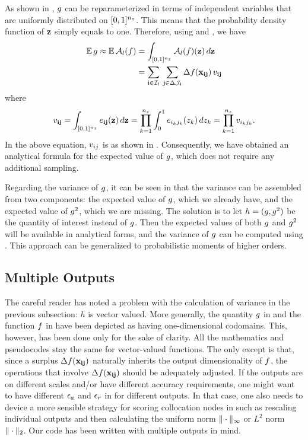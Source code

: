 As shown in , $g$ can be reparameterized in terms of
independent variables that are uniformly distributed on $[0, 1]^{n_z}$. This means
that the probability density function of $\mathbf{z}$ simply equals to one. Therefore,
using  and , we have
\begin{align*}
  \mathbb{E} \, g \approx \mathbb{E} \, \mathcal{A}_{l}(f) &= \int_{[0, 1]^{n_z}} \mathcal{A}_{l}(f)(\mathbf{z}) \, d\mathbf{z} \\
  &= \sum_{\mathbf{i} \in \mathcal{I}_l} \, \sum_{\mathbf{j} \in \Delta\mathcal{J}_{\mathbf{i}}} \Delta f(\mathbf{x}_{\mathbf{i}\mathbf{j}}) \, v_{\mathbf{i}\mathbf{j}}
\end{align*}
where
\[
  v_{\mathbf{i}\mathbf{j}} = \int_{[0, 1]^{n_z}} e_{\mathbf{i}\mathbf{j}}(\mathbf{z}) \, d\mathbf{z} = \prod_{k = 1}^{{n_z}} \int_0^1 e_{i_k j_k}(z_k) \, dz_k = \prod_{k = 1}^{{n_z}} v_{i_k j_k}.
\]
In the above equation, $v_{ij}$ is as shown in . Consequently, we
have obtained an analytical formula for the expected value of $g$, which does
not require any additional sampling.

Regarding the variance of $g$, it can be seen in  that the
variance can be assembled from two components: the expected value of $g$, which
we already have, and the expected value of $g^2$, which we are missing. The
solution is to let $h = (g, g^2)$ be the quantity of interest instead of $g$.
Then the expected values of both $g$ and $g^2$ will be available in analytical
forms, and the variance of $g$ can be computed using . This
approach can be generalized to probabilistic moments of higher orders.

\subsection{Multiple Outputs}
The careful reader has noted a problem with the calculation of variance in the
previous subsection: $h$ is vector valued. More generally, the quantity $g$ in
 and the function $f$ in  have been depicted
as having one-dimensional codomains. This, however, has been done only for the
sake of clarity. All the mathematics and pseudocodes stay the same for
vector-valued functions. The only except is that, since a surplus
$\Delta f(\mathbf{x}_{\mathbf{i}\mathbf{j}})$ naturally inherits the output dimensionality of $f$,
the operations that involve $\Delta f(\mathbf{x}_{\mathbf{i}\mathbf{j}})$ should be adequately
adjusted. If the outputs are on different scales and/or have different accuracy
requirements, one might want to have different $\epsilon_a$ and $\epsilon_r$ in
 for different outputs. In that case, one also needs to
device a more sensible strategy for scoring collocation nodes in 
such as rescaling individual outputs and then calculating the uniform norm
$\| \cdot \|_\infty$ or $L^2$ norm $\| \cdot \|_2$. Our code \cite{sources}
has been written with multiple outputs in mind.

